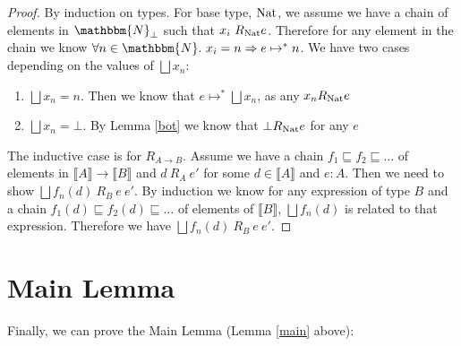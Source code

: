 \begin{proof}
By induction on types. For base type, $\operatorname{Nat}$, we assume we have a chain of elements in $\mathbbm{N}_\bot$ such that $x_i \ R_{\operatorname{Nat}} e$. Therefore for any element in the chain we know $\forall n \in \mathbbm{N} . \ x_i = n \Rightarrow e \mapsto^* n$. We have two cases depending on the values of $\bigsqcup x_n$:

\begin{enumerate}
\item{$\bigsqcup x_n = n$. Then we know that $e \mapsto^* \bigsqcup x_n$, as any $x_n R_{\operatorname{Nat}} e$}
\item{$\bigsqcup x_n = \bot$. By Lemma \ref{bot} we know that $\bot R_{\operatorname{Nat}} e$ for any $e$}
\end{enumerate}

The inductive case is for $R_{A \to B}$. Assume we have a chain $f_1 \sqsubseteq f_2 \sqsubseteq \dots$ of elements in $\llbracket A \rrbracket \to \llbracket B \rrbracket$ and $d \ R_A \ e'$ for some $d \in \llbracket A \rrbracket$ and $e : A$. Then we need to show $\bigsqcup f_n (d) \ R_B \ e \ e'$. By induction we know for any expression of type $B$ and a chain  $f_1(d) \sqsubseteq f_2(d) \sqsubseteq \dots$ of elements of $\llbracket B \rrbracket$, $\bigsqcup f_n(d)$ is related to that expression. Therefore we have $\bigsqcup f_n(d) \ R_B \ e \ e'$.
\end{proof}

\section{Main Lemma}
Finally, we can prove the Main Lemma (Lemma \ref{main} above):




